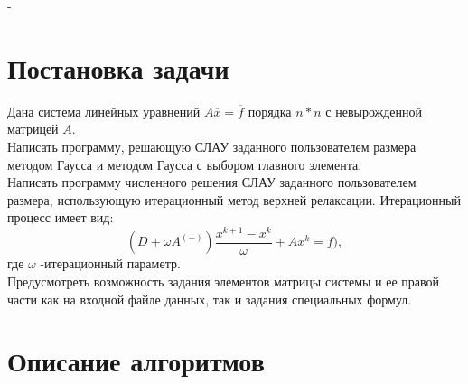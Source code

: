 \documentclass[a4paper,12pt,titlepage,finall]{article}
\begin{document}
\newpage
-
\section{Постановка задачи}

Дана система линейных уравнений $A\overline{x}=\overline{f}$  порядка $n * n$ с невырожденной матрицей $A$. \\
Написать программу, решающую СЛАУ заданного пользователем размера методом Гаусса и методом Гаусса с выбором главного элемента.\\
Написать программу численного решения СЛАУ заданного пользователем размера, использующую
итерационный метод верхней релаксации. Итерационный процесс имеет вид:
$$ (D + \omega A ^ {(-)}) \frac{x^{k+1}-x^{k}}{\omega} + Ax^{k} = f),$$
где $\omega$ -итерационный параметр.\\
Предусмотреть возможность задания элементов матрицы системы и ее правой части как на входной файле данных, так и задания специальных формул.

\newpage


\section{Описание алгоритмов}
\end{document}
